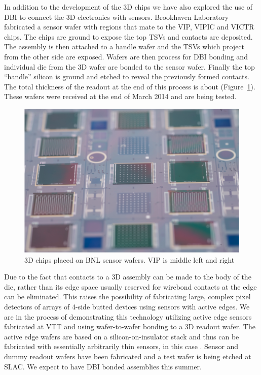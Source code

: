 In addition to the development of the 3D chips we have also explored the use of DBI to connect the 3D electronics with sensors.  Brookhaven Laboratory fabricated a sensor wafer with regions that mate to the VIP, VIPIC and VICTR chips.  The chips are ground to expose the top TSVs and contacts are deposited. The assembly is then attached to a handle wafer and the TSVs which project from the other side are exposed.  Wafers are then process for DBI bonding and individual die from the 3D wafer are bonded to the sensor wafer.  Finally the top ``handle'' silicon is ground and etched to reveal the previously formed contacts.  The total thickness of the readout at the end of this process is about \unit[25]{\micron} (Figure~\ref{fig:VertexDetector:VIP:chipsOnBNLWafer}). These wafers were received at the end of March 2014 and are being tested.
\begin{figure}
    \centering
    \includegraphics[width=.5\textwidth]{VertexDetector/VIP/3DChipsOnBNLWafers}
\caption{3D chips placed on BNL sensor wafers. VIP is middle left and right}
\label{fig:VertexDetector:VIP:chipsOnBNLWafer}
\end{figure}

Due to the fact that contacts to a 3D assembly can be made to the body of the die, rather than its edge space usually reserved for wirebond contacts at the edge can be eliminated.  This raises the possibility of fabricating large, complex pixel detectors of arrays of 4-side butted devices using sensors with active edges.  We are in the process of demonstrating this technology utilizing active edge sensors fabricated at VTT and using wafer-to-wafer bonding to a 3D readout wafer. The active edge wafers are based on a silicon-on-insulator stack and thus can be fabricated with essentially arbitrarily thin sensors, in this case \unit[200]{\micron}. Sensor and dummy readout wafers have been fabricated and a test wafer is being etched at SLAC. We expect to have DBI bonded assemblies this summer.

